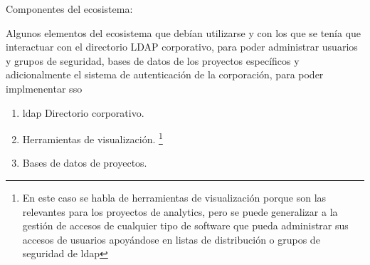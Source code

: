 Componentes del ecosistema:


Algunos elementos del ecosistema que debían utilizarse y con los que se tenía que interactuar con el directorio LDAP corporativo, para poder administrar usuarios y grupos de seguridad, bases de datos de los proyectos específicos y adicionalmente el sistema de autenticación de la corporación, para poder implmenentar \gls{sso}

\begin{enumerate}
    \item \Gls{ldap} Directorio corporativo.
    \item Herramientas de visualización. \footnote{En este caso se habla de herramientas de visualización porque son las relevantes para los proyectos de analytics, pero se puede generalizar a la gestión de accesos de cualquier tipo de software que pueda administrar sus accesos de usuarios apoyándose en listas de distribución o grupos de seguridad de \gls{ldap}}
    \item Bases de datos de proyectos.
    
\end{enumerate}

